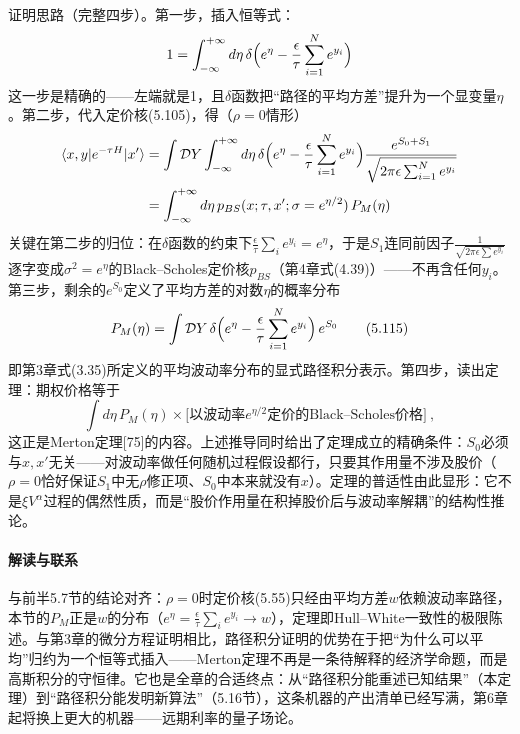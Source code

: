 证明思路（完整四步）。第一步，插入恒等式：
\begin{equation*}
1=\int_{-\infty}^{+\infty}d\eta\,
\delta\Bigl(e^{\eta}-\frac{\epsilon}{\tau}\sum_{i=1}^{N}e^{y_i}\Bigr)
\end{equation*}
这一步是精确的——左端就是1，且$\delta$函数把“路径的平均方差”提升为一个显变量$\eta$。第二步，代入定价核(5.105)，得（$\rho=0$情形）
\begin{align*}
\langle x,y\vert e^{-\tau H}\vert x'\rangle
&=\int\mathcal{D}Y\int_{-\infty}^{+\infty}d\eta\,
\delta\Bigl(e^{\eta}-\frac{\epsilon}{\tau}\sum_{i=1}^{N}e^{y_i}\Bigr)
\frac{e^{S_0+S_1}}{\sqrt{2\pi\epsilon\sum_{i=1}^{N}e^{y_i}}}\\
&=\int_{-\infty}^{+\infty}d\eta\,
p_{BS}(x;\tau,x';\sigma=e^{\eta/2})\,P_{M}(\eta)
\end{align*}
关键在第二步的归位：在$\delta$函数的约束下$\frac{\epsilon}{\tau}\sum_ie^{y_i}=e^{\eta}$，于是$S_{1}$连同前因子$\frac{1}{\sqrt{2\pi\epsilon\sum e^{y_i}}}$逐字变成$\sigma^{2}=e^{\eta}$的Black--Scholes定价核$p_{BS}$（第4章式(4.39)）——不再含任何$y_i$。第三步，剩余的$e^{S_{0}}$定义了平均方差的对数$\eta$的概率分布
\begin{equation*}
P_{M}(\eta)=\int\mathcal{D}Y\,
\delta\Bigl(e^{\eta}-\frac{\epsilon}{\tau}\sum_{i=1}^{N}e^{y_i}\Bigr)\,e^{S_{0}}
\tag{5.115}
\end{equation*}
即第3章式(3.35)所定义的平均波动率分布的显式路径积分表示。第四步，读出定理：期权价格等于
\begin{equation*}
\int d\eta\,P_{M}(\eta)\times\bigl[\text{以波动率}e^{\eta/2}\text{定价的Black--Scholes价格}\bigr]\ ,
\end{equation*}
这正是Merton定理[75]的内容。上述推导同时给出了定理成立的精确条件：$S_{0}$必须与$x,x'$无关——对波动率做任何随机过程假设都行，只要其作用量不涉及股价（$\rho=0$恰好保证$S_1$中无$\rho$修正项、$S_0$中本来就没有$x$）。定理的普适性由此显形：它不是$\xi V^{\alpha}$过程的偶然性质，而是“股价作用量在积掉股价后与波动率解耦”的结构性推论。

\paragraph{解读与联系}
与前半5.7节的结论对齐：$\rho=0$时定价核(5.55)只经由平均方差$w$依赖波动率路径，本节的$P_{M}$正是$w$的分布（$e^{\eta}=\frac{\epsilon}{\tau}\sum_ie^{y_i}\to w$），定理即Hull--White一致性的极限陈述。与第3章的微分方程证明相比，路径积分证明的优势在于把“为什么可以平均”归约为一个恒等式插入——Merton定理不再是一条待解释的经济学命题，而是高斯积分的守恒律。它也是全章的合适终点：从“路径积分能重述已知结果”（本定理）到“路径积分能发明新算法”（5.16节），这条机器的产出清单已经写满，第6章起将换上更大的机器——远期利率的量子场论。

